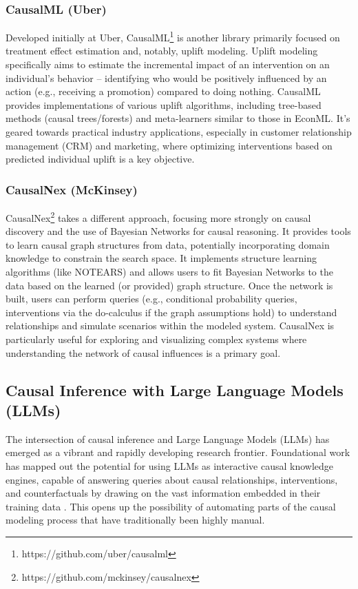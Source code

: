 {\subsubsection{CausalML (Uber)}


Developed initially at Uber, CausalML\footnote{https://github.com/uber/causalml} \cite{zhao2023causal} is another library primarily focused on treatment effect estimation and, notably, uplift modeling. Uplift modeling specifically aims to estimate the incremental impact of an intervention on an individual's behavior – identifying who would be positively influenced by an action (e.g., receiving a promotion) compared to doing nothing. CausalML provides implementations of various uplift algorithms, including tree-based methods (causal trees/forests) and meta-learners similar to those in EconML. It's geared towards practical industry applications, especially in customer relationship management (CRM) and marketing, where optimizing interventions based on predicted individual uplift is a key objective.

\subsubsection{CausalNex (McKinsey)}

CausalNex\footnote{https://github.com/mckinsey/causalnex} takes a different approach, focusing more strongly on causal discovery and the use of Bayesian Networks for causal reasoning. It provides tools to learn causal graph structures from data, potentially incorporating domain knowledge to constrain the search space. It implements structure learning algorithms (like NOTEARS) and allows users to fit Bayesian Networks to the data based on the learned (or provided) graph structure. Once the network is built, users can perform queries (e.g., conditional probability queries, interventions via the do-calculus if the graph assumptions hold) to understand relationships and simulate scenarios within the modeled system. CausalNex is particularly useful for exploring and visualizing complex systems where understanding the network of causal influences is a primary goal.

\newpage

\subsection{Causal Inference with Large Language Models (LLMs)}

The intersection of causal inference and Large Language Models (LLMs) has emerged as a vibrant and rapidly developing research frontier. Foundational work has mapped out the potential for using LLMs as interactive causal knowledge engines, capable of answering queries about causal relationships, interventions, and counterfactuals by drawing on the vast information embedded in their training data \cite{kiciman2023causal}. This opens up the possibility of automating parts of the causal modeling process that have traditionally been highly manual.

}
